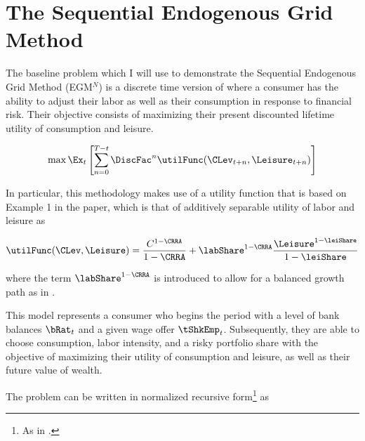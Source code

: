 \documentclass[\econtexRoot/EGMN]{subfiles}
\begin{document}
\notinsubfile{\renewcommand{\econtexRoot}{.}}

\hypertarget{model}{}\par\section{The Sequential Endogenous Grid Method}
\notinsubfile{\label{sec:model}}


The baseline problem which I will use to demonstrate the Sequential Endogenous Grid Method (EGM$^N$) is a discrete time version of \cite{Bodie1992-yp} where a consumer has the ability to adjust their labor as well as their consumption in response to financial risk. Their objective consists of maximizing their present discounted lifetime utility of consumption and leisure.

\begin{equation}
  \max \Ex_{t} \left[ \sum_{n = 0}^{T-t} \DiscFac^{n} \utilFunc(\CLev_{t+n}, \Leisure_{t+n})  \right]
\end{equation}

In particular, this methodology makes use of a utility function that is based on Example 1 in the paper, which is that of additively separable utility of labor and leisure as

\begin{equation}
  \utilFunc(\CLev, \Leisure) = \frac{C^{1-\CRRA}}{1-\CRRA} + \labShare^{1-\CRRA} \frac{\Leisure^{1-\leiShare}}{1-\leiShare}
\end{equation}

where the term $\labShare^{1-\CRRA}$ is introduced to allow for a balanced growth path as in \cite{Mertens2011-ap}.

This model represents a consumer who begins the period with a level of bank balances $\bRat_{t}$ and a given wage offer $\tShkEmp_{t}$. Subsequently, they are able to choose consumption, labor intensity, and a risky portfolio share with the objective of maximizing their utility of consumption and leisure, as well as their future value of wealth.

The problem can be written in normalized recursive form\footnote{As in \cite{Carroll2009-zq}.} as
\end{document}
